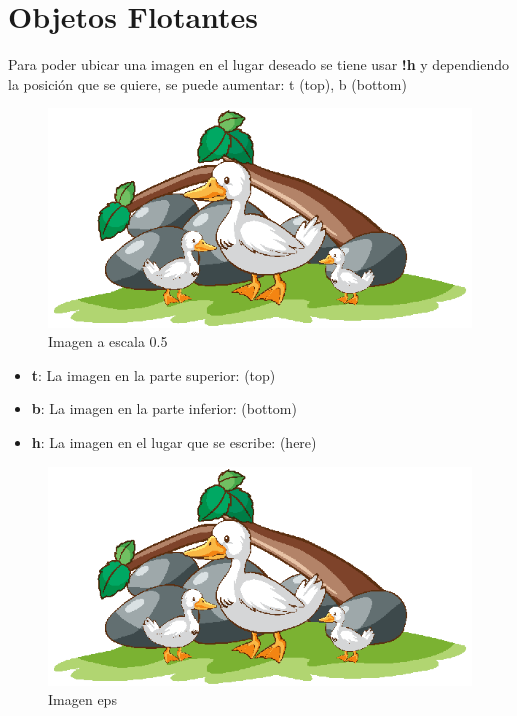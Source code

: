 \documentclass[12pt]{article}
\begin{document}
\newpage
\section{Objetos Flotantes}
Para poder ubicar una imagen en el lugar deseado se tiene
usar \textbf{!h} y dependiendo la posición que se quiere, se
puede aumentar: t (top), b (bottom)
\begin{figure}[!ht]
	\centering
	\includegraphics[scale=0.5]{figures/image1.eps}
	\caption{Imagen a escala 0.5}
	\label{figure1}
\end{figure}

\begin{itemize}
\item \textbf{t}: La imagen en la parte superior: (top)
\item \textbf{b}: La imagen en la parte inferior: (bottom)
\item \textbf{h}: La imagen en el lugar que se escribe: (here)
\end{itemize}

\begin{figure}[!ht]
	\centering
	\includegraphics[scale=1]{figures/image1.eps}
	\caption{Imagen eps}
	\label{figure2}
\end{figure}
\end{document}
